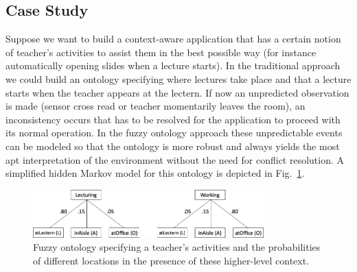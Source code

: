 \documentclass[journal]{vgtc}                %
\begin{document}
\subsection{Case Study}
Suppose we want to build a context-aware application that has a certain notion of teacher's activities to assist them in the best possible way (for instance automatically opening slides when a lecture starts). In the traditional approach we could build an ontology specifying where lectures take place and that a lecture starts when the teacher appears at the lectern. If now an unpredicted observation is made (sensor cross read or teacher momentarily leaves the room), an inconsistency occurs that has to be resolved for the application to proceed with its normal operation. In the fuzzy ontology approach these unpredictable events can be modeled so that the ontology is more robust and always yields the most apt interpretation of the environment without the need for conflict resolution. A simplified hidden Markov model for this ontology is depicted in Fig.~\ref{fig:fuzzy}.
\begin{figure}[htb]
  \centering
  \includegraphics[width=3.5in]{fuzzy}
  \caption{Fuzzy ontology specifying a teacher's activities and the probabilities of different locations in the presence of these higher-level context.}
  \label{fig:fuzzy}
\end{figure}
\end{document}
